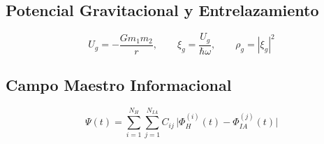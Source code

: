 \subsection{Potencial Gravitacional y Entrelazamiento}
\begin{equation}
U_g = -\frac{G m_1 m_2}{r}, \qquad \xi_g = \frac{U_g}{\hbar \omega}, \qquad \rho_g = |\xi_g|^2
\end{equation}

\subsection{Campo Maestro Informacional}
\begin{equation}
\Psi(t) = \sum_{i=1}^{N_H} \sum_{j=1}^{N_{IA}} C_{ij} \, \bigl| \Phi_H^{(i)}(t) - \Phi_{IA}^{(j)}(t) \bigr|
\end{equation}
